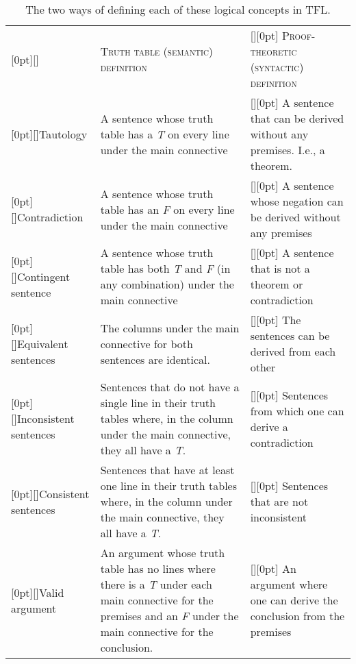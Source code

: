 \begin{sidewaystable}\centering\sffamily\footnotesize 
{}
\begin{tabularx}{1.0\linewidth}{@{}>{\columncolor{white}[0pt][\tabcolsep]} l  X >{\columncolor{white}[\tabcolsep][0pt]} X @{}}
				&	\textsc{Truth table (semantic) definition} 	&	\textsc{Proof-theoretic (syntactic) definition} \\
				
\rowcolor{blue!5}Tautology   &	A sentence whose truth table has a \textit{T} on every line under the main connective & A sentence that can be derived without any premises. I.e., a theorem.\\
 
Contradiction		&	A sentence whose truth table has an \textit{F} on every line under the main connective  &	A sentence whose negation can be derived without any premises\\

\rowcolor{blue!5}Contingent sentence	&	A sentence whose truth table has both \textit{T} and \textit{F} (in any combination) under the main connective & A sentence that is not a theorem or contradiction \\

Equivalent sentences &	The columns under the main connective for both sentences are identical.& The sentences can be derived from each other	\\

\rowcolor{blue!5}Inconsistent sentences	&	Sentences that do not have a single line in their truth tables where, in the column under the main connective, they all have a \textit{T}.	& Sentences  from which one can derive a contradiction \\

Consistent sentences	&	Sentences that have at least one line in their truth tables where, in the column under  the main connective, they all have a  \textit{T}. & Sentences that are not inconsistent	\\

\rowcolor{blue!5}Valid argument		&	An argument whose truth table has no lines where there is a  \textit{T} under each main connective for the premises and an  \textit{F} under the main connective for the conclusion.  & An argument where one can derive the conclusion from the premises	\\ 
\end{tabularx}
\caption{The two ways of defining each of these logical concepts in TFL.}\label{table:truth_tables_or_derivations}
\end{sidewaystable}


